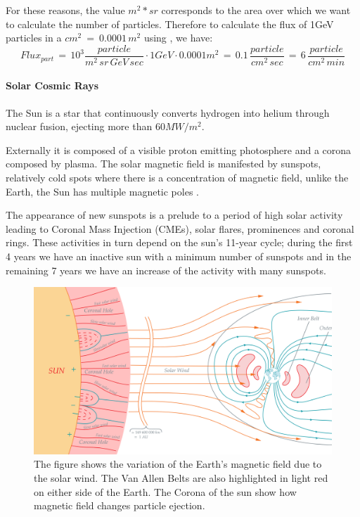 {{{{{						For these reasons, the value $m^2*sr$ corresponds to the area over which we want to calculate the number of particles. Therefore to calculate the flux of 1GeV particles  in a $cm^2\:=\:0.0001\,m^2$ using , we have:
						\begin{equation}
							Flux_{part}\,=\,10^3 \frac{particle}{m^2\,sr\,GeV\,sec}\cdot 1GeV \cdot 0.0001m^2 \, =\, 0.1\,\frac{particle}{cm^2\,sec} \,=\, 6\,\frac{particle}{cm^2\,min}
						\end{equation} 
						
						
				}%
				  
				\paragraph{Solar Cosmic Rays}{
					The Sun is a star that continuously converts hydrogen into helium through nuclear fusion, ejecting more than $60MW/m^2$. 
					
					Externally it is composed of a visible proton emitting photosphere and a corona composed by plasma. The solar magnetic field is manifested by sunspots, relatively cold spots where there is a concentration of magnetic field, unlike the Earth, the Sun has multiple magnetic poles  . 
					
					The appearance of new sunspots is a prelude to a period of high solar activity leading to Coronal Mass Injection (CMEs), solar flares, prominences and coronal rings. These activities in turn depend on the sun's 11-year cycle; during the first 4 years we have an inactive sun with a minimum number of sunspots and in the remaining 7 years we have an increase of the  activity  with many sunspots. 
					\begin{figure}[H]
					\centering
					\includegraphics[width=\textwidth,center]{./images/Magnetosfera_e_raggi_solari_coronalHole.png}
					\caption{The figure shows the variation of the Earth's magnetic field due to the solar wind. The Van Allen Belts are also highlighted in light red on either side of the Earth. The Corona of the sun show how magnetic field changes particle ejection.}
					\label{fig:MagnetosphereVanAllenBelts}
					\end{figure} 
				
}}}}}

